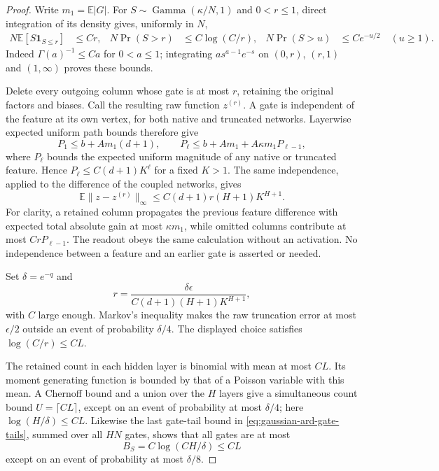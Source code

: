 \begin{proof}
Write $m_1=\mathbb E|G|$. For $S\sim\operatorname{Gamma}(\kappa/N,1)$ and $0<r\le1$, direct integration of its density gives, uniformly in $N$,
\begin{align}
 N\mathbb E[S\mathbf1_{S\le r}]&\le Cr,
 &N\Pr(S>r)&\le C\log(C/r),
 &N\Pr(S>u)&\le Ce^{-u/2}\quad(u\ge1).
 \label{eq:gaussian-ard-gate-tails}
\end{align}
Indeed $\Gamma(a)^{-1}\le Ca$ for $0<a\le1$; integrating $a s^{a-1}e^{-s}$ on $(0,r)$, $(r,1)$ and $(1,\infty)$ proves these bounds.

Delete every outgoing column whose gate is at most $r$, retaining the original factors and biases. Call the resulting raw function $z^{(r)}$. A gate is independent of the feature at its own vertex, for both native and truncated networks. Layerwise expected uniform path bounds therefore give
\[
 P_1\le b+A m_1(d+1),\qquad
 P_\ell\le b+A m_1+A\kappa m_1P_{\ell-1},
\]
where $P_\ell$ bounds the expected uniform magnitude of any native or truncated feature. Hence $P_\ell\le C(d+1)K^\ell$ for a fixed $K>1$. The same independence, applied to the difference of the coupled networks, gives
\begin{equation}
 \mathbb E\|z-z^{(r)}\|_\infty
       \le C(d+1)r(H+1)K^{H+1}.
 \label{eq:gaussian-ard-truncation-error}
\end{equation}
For clarity, a retained column propagates the previous feature difference with expected total absolute gain at most $\kappa m_1$, while omitted columns contribute at most $CrP_{\ell-1}$. The readout obeys the same calculation without an activation. No independence between a feature and an earlier gate is asserted or needed.

Set $\delta=e^{-q}$ and
\[
 r=\frac{\delta\epsilon}{C(d+1)(H+1)K^{H+1}},
\]
with $C$ large enough. Markov's inequality makes the raw truncation error at most $\epsilon/2$ outside an event of probability $\delta/4$. The displayed choice satisfies $\log(C/r)\le CL$.

The retained count in each hidden layer is binomial with mean at most $CL$. Its moment generating function is bounded by that of a Poisson variable with this mean. A Chernoff bound and a union over the $H$ layers give a simultaneous count bound $U=\lceil CL\rceil$, except on an event of probability at most $\delta/4$; here $\log(H/\delta)\le CL$. Likewise the last gate-tail bound in \eqref{eq:gaussian-ard-gate-tails}, summed over all $HN$ gates, shows that all gates are at most
\[
 B_S=C\log(CH/\delta)\le CL
\]
except on an event of probability at most $\delta/8$.


\end{proof}
